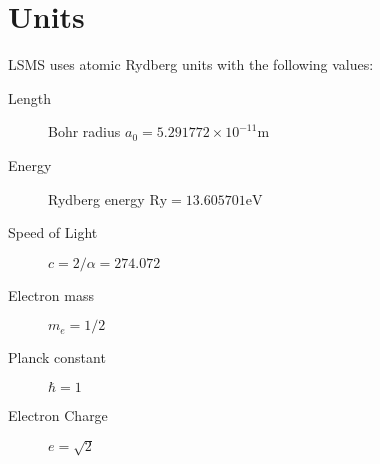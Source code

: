 \chapter{Units}

LSMS uses atomic Rydberg units with the following values:

\begin{description}
\item[Length] Bohr radius $a_0 = 5.291772\times 10^{-11} \mathrm{m}$
\item[Energy] Rydberg energy $\mathrm{Ry} = 13.605701 \mathrm{eV}$
\item[Speed of Light] $c = 2/\alpha = 274.072$
\item[Electron mass] $m_e = 1/2$
\item[Planck constant] $\hbar = 1$
\item[Electron Charge] $e = \sqrt{2}$
\end{description}
